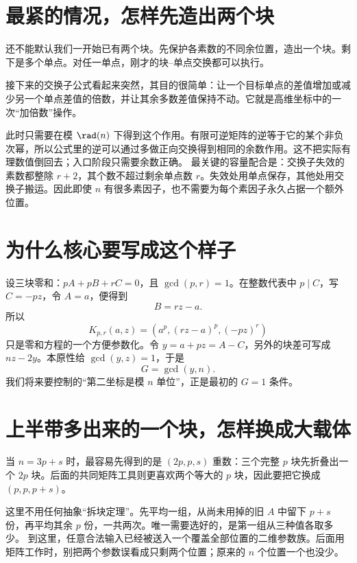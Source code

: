 \section{最紧的情况，怎样先造出两个块}
还不能默认我们一开始已有两个块。先保护各素数的不同余位置，造出一个块。剩下是多个单点。对任一单点，刚才的块--单点交换都可以执行。

接下来的交换子公式看起来突然，其目的很简单：让一个目标单点的差值增加或减少另一个单点差值的倍数，并让其余多数差值保持不动。它就是高维坐标中的一次“加倍数”操作。

此时只需要在模 $\rad(n)$ 下得到这个作用。有限可逆矩阵的逆等于它的某个非负次幂，所以公式里的逆可以通过多做正向交换得到相同的余数作用。这不把实际有理数值倒回去；入口阶段只需要余数正确。
最关键的容量配合是：交换子失效的素数都整除 $r+2$，其个数不超过剩余单点数 $r$。失效处用单点保存，其他处用交换子搬运。因此即使 $n$ 有很多素因子，也不需要为每个素因子永久占据一个额外位置。

\section{为什么核心要写成这个样子}
设三块零和：$pA+pB+rC=0$，且 $\gcd(p,r)=1$。在整数代表中 $p\mid C$，写 $C=-pz$，令 $A=a$，便得到
\[B=rz-a.
\]
所以
\[K_{p,r}(a,z)=(a^p,(rz-a)^p,(-pz)^r)
\]
只是零和方程的一个方便参数化。令 $y=a+pz=A-C$，另外的块差可写成 $nz-2y$。本原性给 $\gcd(y,z)=1$，于是
\[G=\gcd(y,n).
\]
我们将来要控制的“第二坐标是模 $n$ 单位”，正是最初的 $G=1$ 条件。

\section{上半带多出来的一个块，怎样换成大载体}
当 $n=3p+s$ 时，最容易先得到的是 $(2p,p,s)$ 重数：三个完整 $p$ 块先折叠出一个 $2p$ 块。后面的共同矩阵工具则更喜欢两个等大的 $p$ 块，因此要把它换成 $(p,p,p+s)$。

这里不用任何抽象“拆块定理”。先平均一组，从尚未用掉的旧 $A$ 中留下 $p+s$ 份，再平均其余 $p$ 份，一共两次。唯一需要选好的，是第一组从三种值各取多少。
到这里，任意合法输入已经被送入一个覆盖全部位置的二维参数族。后面用矩阵工作时，别把两个参数误看成只剩两个位置；原来的 $n$ 个位置一个也没少。
